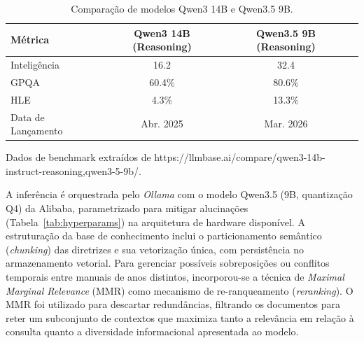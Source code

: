 \documentclass[12pt]{article}
\begin{document}
\begin{table}[H]
  \centering
  \begin{threeparttable}
  \caption{Comparação de modelos Qwen3 14B e Qwen3.5 9B.}
  \label{tab:comparison_models}
  \footnotesize
  \begin{tabular}{l c c r}
    \toprule
    \textbf{Métrica}    & \textbf{Qwen3 14B (Reasoning)}  & \textbf{Qwen3.5 9B (Reasoning)} \\
    \midrule
    Inteligência        & 16.2                            & 32.4  \\
    GPQA                & 60.4\%                          & 80.6\% \\
    HLE                 & 4.3\%                           & 13.3\% \\
    Data de Lançamento  & Abr. 2025                       & Mar. 2026 \\
    \bottomrule
  \end{tabular}
  \begin{tablenotes}
    \footnotesize
    \item[*] Dados de benchmark extraídos de https://llmbase.ai/compare/qwen3-14b-instruct-reasoning,qwen3-5-9b/.
  \end{tablenotes}
  \end{threeparttable}
\end{table}

A inferência é orquestrada pelo \textit{Ollama} com o modelo Qwen3.5 (9B, quantização Q4) da Alibaba, parametrizado para mitigar alucinações (Tabela~\ref{tab:hyperparams}) na arquitetura de hardware disponível.
A estruturação da base de conhecimento inclui o particionamento semântico (\textit{chunking}) das diretrizes e sua vetorização única, com persistência no armazenamento vetorial.
Para gerenciar possíveis sobreposições ou conflitos temporais entre manuais de anos distintos, incorporou-se a técnica de \textit{Maximal Marginal Relevance} (MMR) como mecanismo de re-ranqueamento (\textit{reranking}).
O MMR foi utilizado para descartar redundâncias, filtrando os documentos para reter um subconjunto de contextos que maximiza tanto a relevância em relação à consulta quanto a diversidade informacional apresentada ao modelo.
\end{document}

